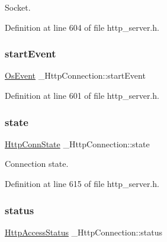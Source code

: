 Socket. 



Definition at line 604 of file http\+\_\+server.\+h.

\mbox{\label{struct__HttpConnection_a4f33d2e1a3203b752e73d8ad0b018932}} 
\subsubsection{\texorpdfstring{start\+Event}{startEvent}}
{\footnotesize\ttfamily \hyperlink{structOsEvent}{Os\+Event} \+\_\+\+Http\+Connection\+::start\+Event}



Definition at line 601 of file http\+\_\+server.\+h.

\mbox{\label{struct__HttpConnection_a489d1242b77a233572ff2d9d65661ccf}} 
\subsubsection{\texorpdfstring{state}{state}}
{\footnotesize\ttfamily \hyperlink{http__server_8h_a8342e12cba584e291d33ff5767f2680e}{Http\+Conn\+State} \+\_\+\+Http\+Connection\+::state}



Connection state. 



Definition at line 615 of file http\+\_\+server.\+h.

\mbox{\label{struct__HttpConnection_acdbeb9e2efd1fe6910ca0155c5544280}} 
\subsubsection{\texorpdfstring{status}{status}}
{\footnotesize\ttfamily \hyperlink{http__server_8h_a208042b9481360af1650fad94cd93769}{Http\+Access\+Status} \+\_\+\+Http\+Connection\+::status}



